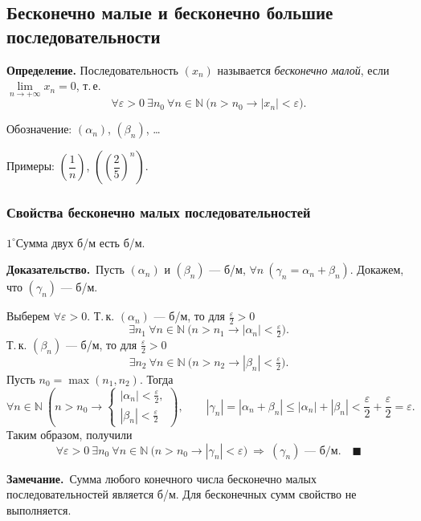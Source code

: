 \documentclass[a4paper,11pt]{article}
\newcommand{\zam}{\textbf{Замечание.}\ }
\newcommand{\dok}{\textbf{Доказательство.}\ }
\begin{document}
\subsection{Бесконечно малые и бесконечно большие последовательности}

\begin{opr}
\textbf{Определение.}
  Последовательность $(x_n)$ называется \emph{бесконечно малой}, если
  $\lim\limits_{n \to +\infty} x_n = 0$, т.\,е.
  \[
    \forall \varepsilon > 0\ \exists n_0\ \forall n \in \mathbb{N}\
    \big(n > n_0 \to |x_n| < \varepsilon\big).
  \]
\end{opr}

Обозначение: $(\alpha_n)$, $(\beta_n)$, \dots

Примеры: $\left(\dfrac{1}{n}\right)$, $\left(\left(\dfrac{2}{5}\right)^n\right)$.

\subsubsection{Свойства бесконечно малых последовательностей}

\begin{svoi}{$1^\circ$}Сумма двух б/м есть б/м.
\end{svoi}

\dok Пусть $(\alpha_n)$ и $(\beta_n)$ --- б/м,
$\forall n\ (\gamma_n = \alpha_n + \beta_n)$. Докажем, что $(\gamma_n)$ --- б/м.

Выберем $\forall \varepsilon > 0$. Т.\,к. $(\alpha_n)$ --- б/м, то для
$\frac{\varepsilon}{2} > 0$
\[
  \exists n_1\ \forall n \in \mathbb{N}\ \big(n > n_1 \to |\alpha_n| < \tfrac{\varepsilon}{2}\big).
\]
Т.\,к. $(\beta_n)$ --- б/м, то для $\frac{\varepsilon}{2} > 0$
\[
  \exists n_2\ \forall n \in \mathbb{N}\ \big(n > n_2 \to |\beta_n| < \tfrac{\varepsilon}{2}\big).
\]
Пусть $n_0 = \max(n_1, n_2)$. Тогда
\[
  \forall n \in \mathbb{N}\ \left(n > n_0 \to
  \begin{cases} |\alpha_n| < \frac{\varepsilon}{2},\\[2pt] |\beta_n| < \frac{\varepsilon}{2} \end{cases}\right),
  \qquad
  |\gamma_n| = |\alpha_n + \beta_n| \le |\alpha_n| + |\beta_n|
  < \frac{\varepsilon}{2} + \frac{\varepsilon}{2} = \varepsilon.
\]
Таким образом, получили
\[
  \forall \varepsilon > 0\ \exists n_0\ \forall n \in \mathbb{N}\
  \big(n > n_0 \to |\gamma_n| < \varepsilon\big)
  \ \Longrightarrow\ (\gamma_n) \text{ --- б/м}.\quad\blacksquare
\]

\zam Сумма любого конечного числа бесконечно малых
последовательностей является б/м. Для бесконечных сумм свойство не выполняется.
\end{document}
